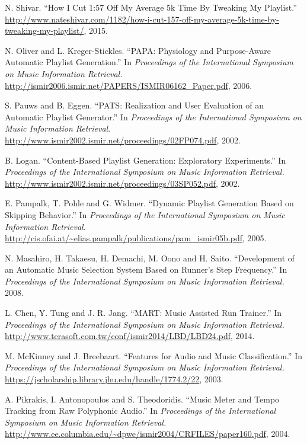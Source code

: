 \documentclass{article}
\begin{document}
\begin{thebibliography}{cites}
\raggedright
{}
N. Shivar. ``How I Cut 1:57 Off My Average 5k Time By Tweaking My Playlist.'' \url{http://www.nateshivar.com/1182/how-i-cut-157-off-my-average-5k-time-by-tweaking-my-playlist/}, 2015.

N. Oliver and L. Kreger-Stickles. ``PAPA: Physiology and Purpose-­Aware Automatic Playlist Generation.'' In {\it Proceedings of the International Symposium on Music Information Retrieval.} \url{http://ismir2006.ismir.net/PAPERS/ISMIR06162_Paper.pdf}, 2006.

S. Pauws and B. Eggen. ``PATS: Realization and User Evaluation of an Automatic Playlist Generator.'' In {\it Proceedings of the International Symposium on Music Information Retrieval}. \url{http://www.ismir2002.ismir.net/proceedings/02FP074.pdf}, 2002.

B. Logan. ``Content-­Based Playlist Generation: Exploratory Experiments.'' In {\it Proceedings of the International Symposium on Music Information Retrieval.} \url{http://www.ismir2002.ismir.net/proceedings/03SP052.pdf}, 2002.

E. Pampalk, T. Pohle and G. Widmer. ``Dynamic Playlist Generation Based on Skipping Behavior.'' In {\it Proceedings of the International Symposium on Music Information Retrieval.} \url{http://cis.ofai.at/~elias.pampalk/publications/pam_ismir05b.pdf}, 2005.

N. Masahiro, H. Takaesu, H. Demachi, M. Oono and H. Saito. ``Development of an Automatic Music Selection System Based on Runner's Step Frequency.'' In {\it Proceedings of the International Symposium on Music Information Retrieval.} 2008.

L. Chen, Y. Tung and J. R. Jang. ``MART: Music Assisted Run Trainer.'' In {\it Proceedings of the International Symposium on Music Information Retrieval.} \url{http://www.terasoft.com.tw/conf/ismir2014/LBD/LBD24.pdf}, 2014.

M. McKinney and J. Breebaart. ``Features for Audio and Music Classification.'' In {\it Proceedings of the International Symposium on Music Information Retrieval.} \url{https://jscholarship.library.jhu.edu/handle/1774.2/22}, 2003.

A. Pikrakis, I. Antonopoulos and S. Theodoridis. ``Music Meter and Tempo Tracking from Raw Polyphonic Audio.'' In {\it Proceedings of the International Symposium on Music Information Retrieval.} \url{http://www.ee.columbia.edu/~dpwe/ismir2004/CRFILES/paper160.pdf}, 2004.


\end{thebibliography}
\end{document}
